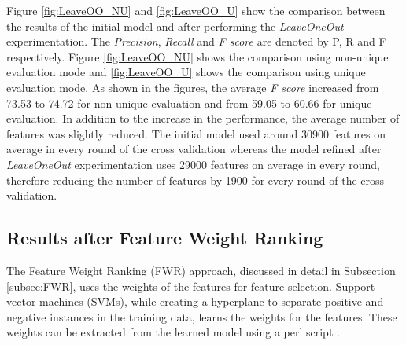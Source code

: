 Figure \ref{fig:LeaveOO_NU} and \ref{fig:LeaveOO_U} show the comparison between the results of the initial model and after performing the \emph{LeaveOneOut} experimentation.  The \textit{Precision}, \textit{Recall} and \textit{F score} are denoted by P, R and F respectively. Figure \ref{fig:LeaveOO_NU} shows the comparison using non-unique evaluation mode and \ref{fig:LeaveOO_U} shows the comparison using unique evaluation mode. As shown in the figures, the average \textit{F score} increased from 73.53 to 74.72 for non-unique evaluation and from 59.05 to 60.66 for unique evaluation. In addition to the increase in the performance, the average number of features was slightly reduced. The initial model used around 30900 features on average in every round of the cross validation whereas the model refined after \emph{LeaveOneOut} experimentation uses 29000 features on average in every round, therefore reducing the number of features by 1900 for every round of the cross-validation.

\subsection{Results after Feature Weight Ranking}

The Feature Weight Ranking (FWR) approach, discussed in detail in Subsection \ref{subsec:FWR}, uses the weights of the features for feature selection. Support vector machines (SVMs), while creating a hyperplane to separate positive and negative instances in the training data, learns the weights for the features. These weights can be extracted from the learned model using a perl script \cite{svmlightonline}.


